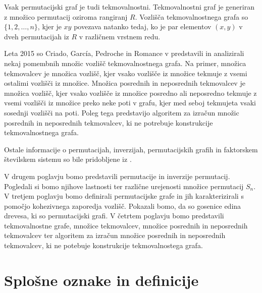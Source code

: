 \documentclass[a4paper, 12pt]{book}
\begin{document}
Vsak permutacijski graf je tudi tekmovalnostni. Tekmovalnostni graf je generiran z množico permutacij oziroma rangiranj $R$. Vozlišča tekmovalnostnega grafa so $\{ 1, 2, \dots, n \}$, kjer je $xy$ povezava natanko tedaj, ko je par elementov $(x, y)$ v dveh permutacijah iz $R$ v različnem vrstnem redu. 

Leta 2015 so Criado, García, Pedroche in Romance v \cite{setsOfRankings} predstavili in analizirali nekaj pomembnih množic vozlišč tekmovalnostnega grafa. Na primer, množica tekmovalcev je množica vozlišč, kjer vsako vozlišče iz množice tekmuje z vsemi ostalimi vozlišči iz množice. Množica posrednih in neposrednih tekmovalcev je množica vozlišč, kjer vsako vozlišče iz množice posredno ali neposredno tekmuje z vsemi vozlišči iz množice preko neke poti v grafu, kjer med seboj tekmujeta vsaki sosednji vozlišči na poti. Poleg tega predstavijo algoritem za izračun množic posrednih in neposrednih tekmovalcev, ki ne potrebuje konstrukcije tekmovalnostnega grafa.

Ostale informacije o permutacijah, inverzijah, permutacijskih grafih in faktorskem številskem sistemu so bile pridobljene iz \cite{algorithmDesign, dsSkripta, inversionCoding, factorialNumberSystem, algorithmGraphTheoryAndPerfectGraphs}.

V drugem poglavju bomo predstavili permutacije in inverzije permutacij. Pogledali si bomo njihove lastnosti ter različne urejenosti množice permutacij $S_n$. V tretjem poglavju bomo definirali permutacijske grafe in jih karakterizirali s pomočjo kohezivnega zaporedja vozlišč. Pokazali bomo, da so gosenice edina drevesa, ki so permutacijski grafi. V četrtem poglavju bomo predstavili tekmovalnostne grafe, množice tekmovalcev, množice posrednih in neposrednih tekmovalcev ter algoritem za izračun množice posrednih in neposrednih tekmovalcev, ki ne potebuje konstrukcije tekmovalnostega grafa.

\section{ Splošne oznake in definicije }
\end{document}
